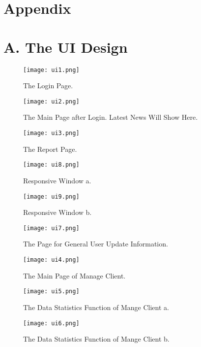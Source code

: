 \documentclass[12pt]{article}
\begin{document}
\section*{Appendix}
\appendix
\section*{A. The UI Design}
\begin{figure}[ht]
\centering
\texttt{[image: ui1.png]}
\caption{The Login Page.}
\label{fig:label}
\end{figure}
\begin{figure}[ht]
\centering
\texttt{[image: ui2.png]}
\caption{The Main Page after Login. Latest News Will Show Here.}
\label{fig:label}
\end{figure}
\newpage
\begin{figure}[ht]
\centering
\texttt{[image: ui3.png]}
\caption{The Report Page.}
\label{fig:label}
\end{figure}
\begin{figure}[ht]
\centering
\texttt{[image: ui8.png]}
\caption{Responsive Window a.}
\label{fig:label}
\end{figure}
\begin{figure}[ht]
\centering
\texttt{[image: ui9.png]}
\caption{Responsive Window b.}
\label{fig:label}
\end{figure}
\newpage
\begin{figure}[ht]
\centering
\texttt{[image: ui7.png]}
\caption{The Page for General User Update Information.}
\label{fig:label}
\end{figure}
\begin{figure}[ht]
\centering
\texttt{[image: ui4.png]}
\caption{The Main Page of Manage Client.}
\label{fig:label}
\end{figure}
\newpage
\begin{figure}[ht]
\centering
\texttt{[image: ui5.png]}
\caption{The Data Statistics Function of Mange Client a.}
\label{fig:label}
\end{figure}
\begin{figure}[ht]
\centering
\texttt{[image: ui6.png]}
\caption{The Data Statistics Function of Mange Client b.}
\label{fig:label}
\end{figure}
\newpage
\end{document}
